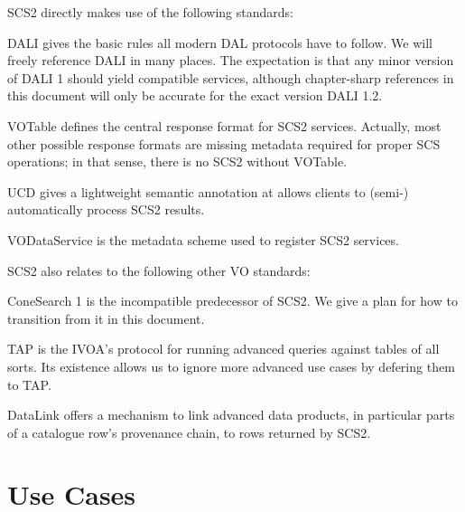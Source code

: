 \documentclass[11pt,a4paper]{ivoa}
\begin{document}
SCS2 directly makes use of the following standards:

\begin{bigdescription}
\item[DALI] \citet{2017ivoa.spec.0517D} gives the basic rules all modern
DAL protocols have to follow.  We will freely reference DALI in many
places.  The expectation is that any minor version of DALI 1 should yield
compatible services, although chapter-sharp references in this document
will only be accurate for the exact version DALI 1.2.

\item[VOTable] \citet{2025ivoa.spec.0116O} defines the central response
format for SCS2 services.  Actually, most other possible response
formats are missing metadata required for proper SCS operations; in that
sense, there is no SCS2 without VOTable.

\item[UCD] \citet{2005ivoa.spec.0819D} gives a lightweight semantic
annotation at allows clients to (semi-) automatically process SCS2
results.

\item[VODataService] \citet{2021ivoa.spec.1102D} is the metadata scheme
used to register SCS2 services.

\end{bigdescription}

SCS2 also relates to the following other VO standards:

\begin{bigdescription}
 \item[ConeSearch 1] \citet{2008ivoa.specQ0222P} is the incompatible
predecessor of SCS2.  We give a plan for how to transition from it in
this document.

\item[TAP] \citet{2019ivoa.spec.0927D} is the IVOA's protocol for
running advanced queries against tables of all sorts.  Its existence
allows us to ignore more advanced use cases by defering them to TAP.

\item[DataLink] \citet{2023ivoa.spec.1215B} offers a mechanism to link
advanced data products, in particular parts of a catalogue row's
provenance chain, to rows returned by SCS2.
\end{bigdescription}

\section{Use Cases}
\end{document}
